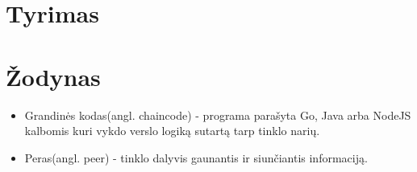 \documentclass{VUMIFPSkursinis}
\begin{document}
\section{Tyrimas}

\section{Žodynas}
\begin{itemize}
	\item{Grandinės kodas(angl. chaincode) - programa parašyta Go, Java arba NodeJS kalbomis kuri vykdo
 verslo logiką sutartą tarp tinklo narių.}
	\item{Peras(angl. peer) - tinklo dalyvis gaunantis ir siunčiantis informaciją.}
\end{itemize}


\printbibliography[heading=bibintoc]  
\end{document}
